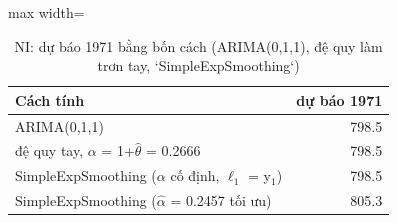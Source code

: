 \begin{table}[H]
\centering\small
\caption{NI: dự báo 1971 bằng bốn cách (ARIMA(0,1,1), đệ quy làm trơn tay, `SimpleExpSmoothing`)}\label{tab:tab_b12_07_ses_forecasts}
\begin{adjustbox}{max width=\linewidth}
\begin{tabular}{>{\raggedright\arraybackslash}p{}r}
\toprule
Cách tính & dự báo 1971 \\
\midrule
ARIMA(0,1,1) & 798.5 \\
đệ quy tay, $\alpha$ = 1+$\hat{\theta}$ = 0.2666 & 798.5 \\
SimpleExpSmoothing ($\alpha$ cố định, $\ell_{1}$ = y$_{1}$) & 798.5 \\
SimpleExpSmoothing ($\hat{\alpha}$ = 0.2457 tối ưu) & 805.3 \\
\bottomrule
\end{tabular}
\end{adjustbox}
\end{table}
